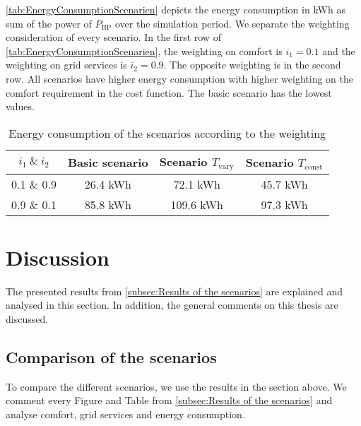 \autoref{tab:EnergyConsumptionScenarien} depicts the energy consumption in kWh as sum of the power of $P_\text{HP}$ over the simulation period. We separate the weighting consideration of every scenario. In the first row of \autoref{tab:EnergyConsumptionScenarien}, the weighting on comfort is $i_\text{1}=0.1$ and the weighting on grid services is $i_\text{2}=0.9$. The opposite weighting is in the second row. All scenarios have higher energy consumption with higher weighting on the comfort requirement in the cost function. The basic scenario has the lowest values. 
    \begin{table}[H]
        \centering
        \begin{tabular}{c||c|c|c}
          $i_\text{1} \ \& \  i_\text{2}$  &  Basic scenario & Scenario $T_\text{vary}$& Scenario $T_\text{const}$\\
          \hline  \hline
             0.1 \& 0.9 & 26.4 kWh & 72.1 kWh & 45.7 kWh\\
             0.9 \& 0.1 & 85.8 kWh & 109.6 kWh & 97.3 kWh\\
        \end{tabular}
        \caption{Energy consumption of the scenarios according to the weighting}
        \label{tab:EnergyConsumptionScenarien}
    \end{table}

\section{Discussion}
\label{sec:discussion}
The presented results from \autoref{subsec:Results of the scenarios} are explained and analysed in this section. In addition, the general comments on this thesis are discussed.

\subsection{Comparison of the scenarios}
\label{subsec:Comparison fo the scenarios}
To compare the different scenarios, we use the results in the section above. We comment every Figure and Table from \autoref{subsec:Results of the scenarios} and analyse comfort, grid services and energy consumption.\newline

